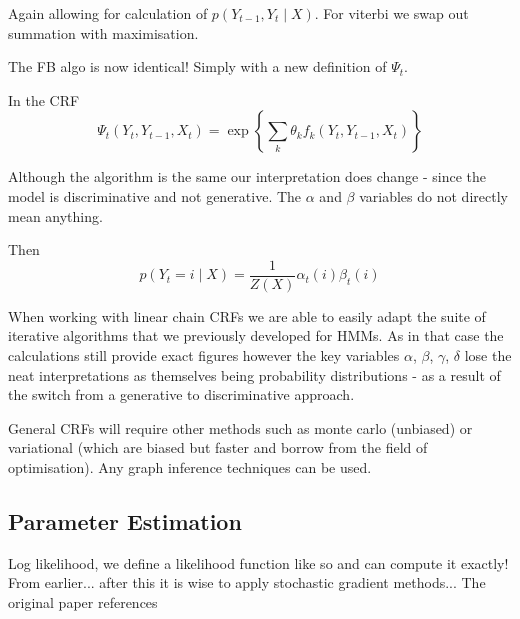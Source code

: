 \documentclass[../main.tex]{subfiles}
\begin{document}
Again allowing for calculation of $p (Y_{t-1}, Y_t \mid X)$.
For viterbi we swap out summation with maximisation.

The FB algo is now identical! Simply with a new definition of $\Psi_t$.

In the CRF
\begin{equation*}
    \Psi_t (Y_t,Y_{t-1},X_t) = \exp \left\{ \sum_k \theta_k f_k(Y_t,Y_{t-1},X_t)\right\}
\end{equation*}

Although the algorithm is the same our interpretation does change - since the model is discriminative and not generative. The $\alpha$ and $\beta$ variables do not directly mean anything.

Then
\begin{equation*}
    p (Y_t=i \mid X) = \frac{1}{Z(X)} \alpha_t(i)\beta_t(i)
\end{equation*}

When working with linear chain CRFs we are able to easily adapt the suite of iterative algorithms that we previously developed for HMMs.
As in that case the calculations still provide exact figures however the key variables $\alpha$, $\beta$, $\gamma$, $\delta$ lose the neat interpretations as themselves being probability distributions - as a result of the switch from a generative to discriminative approach.


General CRFs will require other methods such as monte carlo (unbiased) or variational (which are biased but faster and borrow from the field of optimisation).
Any graph inference techniques can be used.

\subsection{Parameter Estimation}

Log likelihood, we define a likelihood function like so
and can compute it exactly! From earlier...
after this it is wise to apply stochastic gradient methods...
The original paper references \autocite{della-1997-crfparam}
\end{document}
